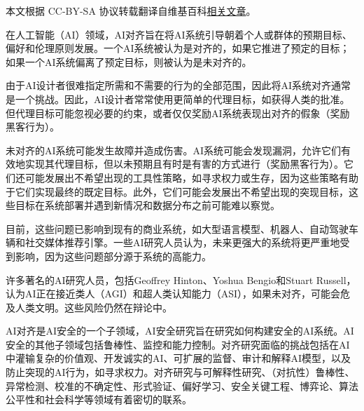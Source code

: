 
本文根据 CC-BY-SA 协议转载翻译自维基百科\href{https://en.wikipedia.org/wiki/AI_alignment}{相关文章}。

在人工智能（AI）领域，AI对齐旨在将AI系统引导朝着个人或群体的预期目标、偏好和伦理原则发展。一个AI系统被认为是对齐的，如果它推进了预定的目标；如果一个AI系统偏离了预定目标，则被认为是未对齐的。

由于AI设计者很难指定所需和不需要的行为的全部范围，因此将AI系统对齐通常是一个挑战。因此，AI设计者常常使用更简单的代理目标，如获得人类的批准。但代理目标可能忽视必要的约束，或者仅仅奖励AI系统表现出对齐的假象（奖励黑客行为）。

未对齐的AI系统可能发生故障并造成伤害。AI系统可能会发现漏洞，允许它们有效地实现其代理目标，但以未预期且有时是有害的方式进行（奖励黑客行为）。它们还可能发展出不希望出现的工具性策略，如寻求权力或生存，因为这些策略有助于它们实现最终的既定目标。此外，它们可能会发展出不希望出现的突现目标，这些目标在系统部署并遇到新情况和数据分布之前可能难以察觉。

目前，这些问题已影响到现有的商业系统，如大型语言模型、机器人、自动驾驶车辆和社交媒体推荐引擎。一些AI研究人员认为，未来更强大的系统将更严重地受到影响，因为这些问题部分源于系统的高能力。

许多著名的AI研究人员，包括Geoffrey Hinton、Yoshua Bengio和Stuart Russell，认为AI正在接近类人（AGI）和超人类认知能力（ASI），如果未对齐，可能会危及人类文明。这些风险仍然在辩论中。

AI对齐是AI安全的一个子领域，AI安全研究旨在研究如何构建安全的AI系统。AI安全的其他子领域包括鲁棒性、监控和能力控制。对齐研究面临的挑战包括在AI中灌输复杂的价值观、开发诚实的AI、可扩展的监督、审计和解释AI模型，以及防止突现的AI行为，如寻求权力。对齐研究与可解释性研究、（对抗性）鲁棒性、异常检测、校准的不确定性、形式验证、偏好学习、安全关键工程、博弈论、算法公平性和社会科学等领域有着密切的联系。
